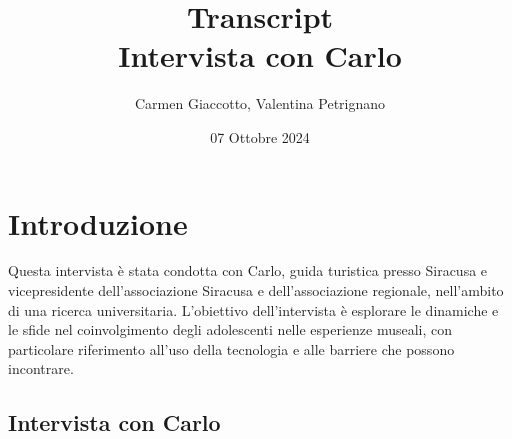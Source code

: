 \documentclass{article}
\title{Transcript \\ Intervista con Carlo}
\author{Carmen Giaccotto, Valentina Petrignano}
\date{07 Ottobre 2024}
\begin{document}
\maketitle

\section{Introduzione}
Questa intervista è stata condotta con Carlo, guida turistica presso Siracusa e vicepresidente dell’associazione Siracusa e dell’associazione regionale, nell'ambito di una ricerca universitaria. L'obiettivo dell'intervista è esplorare le dinamiche e le sfide nel coinvolgimento degli adolescenti nelle esperienze museali, con particolare riferimento all'uso della tecnologia e alle barriere che possono incontrare.

\subsection{\textcolor{subsectioncolor}{Intervista con Carlo}}
\end{document}
